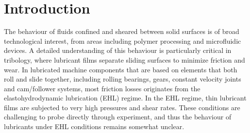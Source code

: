 \documentclass[aps,prb,reprint,superscriptaddress, a4paper]{revtex4-1}
\begin{document}
\pacs{}

\maketitle


\section{Introduction}

The behaviour of fluids confined and sheared between solid surfaces is of broad technological interest, from areas including polymer processing and microfluidic devices. A detailed understanding of this behaviour is particularly critical in tribology, where lubricant films separate sliding surfaces to minimize friction and wear. In lubricated machine components that are based on elements that both roll and slide together, including rolling bearings, gears, constant velocity joints and cam/follower systems, most friction losses originates from the elastohydrodynamic lubrication (EHL) regime. In the EHL regime, thin lubricant films are subjected to very high pressures and shear rates. These conditions are challenging to probe directly through experiment, and thus the behaviour of lubricants under EHL conditions remains somewhat unclear\cite{Spikes2014}.
\end{document}
